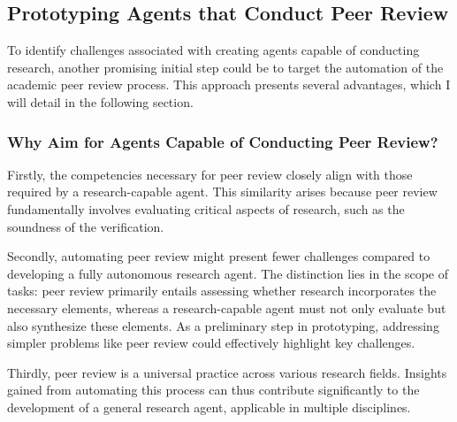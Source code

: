 

\subsection{Prototyping Agents that Conduct Peer Review}
To identify challenges associated with creating agents capable of conducting research, another promising initial step could be to target the automation of the academic peer review process. This approach presents several advantages, which I will detail in the following section.


\subsubsection{Why Aim for Agents Capable of Conducting Peer Review?}

Firstly, the competencies necessary for peer review closely align with those required by a research-capable agent. This similarity arises because peer review fundamentally involves evaluating critical aspects of research, such as the soundness of the verification.

Secondly, automating peer review might present fewer challenges compared to developing a fully autonomous research agent. The distinction lies in the scope of tasks: peer review primarily entails assessing whether research incorporates the necessary elements, whereas a research-capable agent must not only evaluate but also synthesize these elements. As a preliminary step in prototyping, addressing simpler problems like peer review could effectively highlight key challenges.

Thirdly, peer review is a universal practice across various research fields. Insights gained from automating this process can thus contribute significantly to the development of a general research agent, applicable in multiple disciplines.

